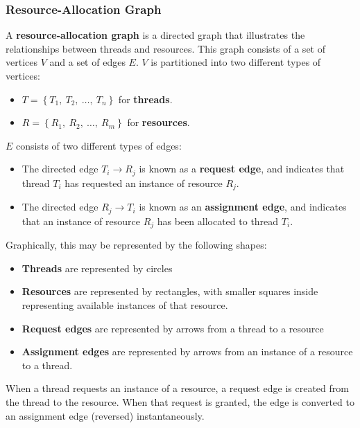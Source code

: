\documentclass{article}
\begin{document}
\subsubsection{Resource-Allocation Graph}
A \textbf{resource-allocation graph} is a directed graph that
illustrates the relationships between threads and resources. This graph
consists of a set of vertices \(V\) and a set of edges \(E\). \(V\) is
partitioned into two different types of vertices:
\begin{itemize}
    \item \(T = \left\{ T_1,\: T_2,\: \ldots,\: T_n \right\}\) for \textbf{threads}.
    \item \(R = \left\{ R_1,\: R_2,\: \ldots,\: R_m \right\}\) for \textbf{resources}.
\end{itemize}
\(E\) consists of two different types of edges:
\begin{itemize}
    \item The directed edge \(T_i \rightarrow R_j\) is known as a
          \textbf{request edge}, and indicates that thread \(T_i\) has
          requested an instance of resource \(R_j\).
    \item The directed edge \(R_j \rightarrow T_i\) is known as an
          \textbf{assignment edge}, and indicates that an instance of
          resource \(R_j\) has been allocated to thread \(T_i\).
\end{itemize}
Graphically, this may be represented by the following shapes:
\begin{itemize}
    \item \textbf{Threads} are represented by circles
    \item \textbf{Resources} are represented by rectangles, with smaller
          squares inside representing available instances of that resource.
    \item \textbf{Request edges} are represented by arrows from a thread to a resource
    \item \textbf{Assignment edges} are represented by arrows from an instance of a
          resource to a thread.
\end{itemize}
When a thread requests an instance of a resource, a request edge is
created from the thread to the resource. When that request is granted,
the edge is converted to an assignment edge (reversed) instantaneously.
\end{document}
